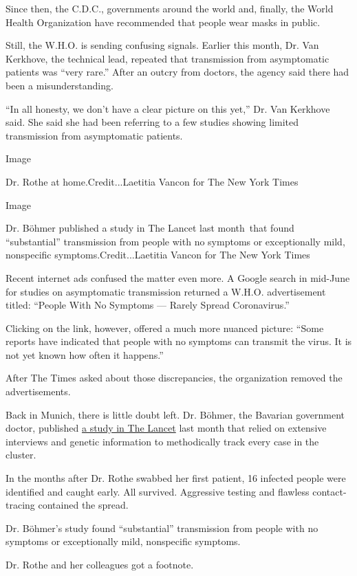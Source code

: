 Since then, the C.D.C., governments around the world and, finally, the
World Health Organization have recommended that people wear masks in
public.

Still, the W.H.O. is sending confusing signals. Earlier this month, Dr.
Van Kerkhove, the technical lead, repeated that transmission from
asymptomatic patients was ``very rare.'' After an outcry from doctors,
the agency said there had been a misunderstanding.

``In all honesty, we don't have a clear picture on this yet,'' Dr. Van
Kerkhove said. She said she had been referring to a few studies showing
limited transmission from asymptomatic patients.

Image

Dr. Rothe at home.Credit...Laetitia Vancon for The New York Times

Image

Dr. Böhmer published a study in The Lancet last month~that found
``substantial'' transmission from people with no symptoms or
exceptionally mild, nonspecific symptoms.Credit...Laetitia Vancon for
The New York Times

Recent internet ads confused the matter even more. A Google search in
mid-June for studies on asymptomatic transmission returned a W.H.O.
advertisement titled: ``People With No Symptoms --- Rarely Spread
Coronavirus.''

Clicking on the link, however, offered a much more nuanced picture:
``Some reports have indicated that people with no symptoms can transmit
the virus. It is not yet known how often it happens.''

After The Times asked about those discrepancies, the organization
removed the advertisements.

Back in Munich, there is little doubt left. Dr. Böhmer, the Bavarian
government doctor, published
\href{https://www.thelancet.com/journals/laninf/article/PIIS1473-3099(20)30314-5/fulltex}{a
study in The Lancet} last month that relied on extensive interviews and
genetic information to methodically track every case in the cluster.

In the months after Dr. Rothe swabbed her first patient, 16 infected
people were identified and caught early. All survived. Aggressive
testing and flawless contact-tracing contained the spread.

Dr. Böhmer's study found ``substantial'' transmission from people with
no symptoms or exceptionally mild, nonspecific symptoms.

Dr. Rothe and her colleagues got a footnote.

